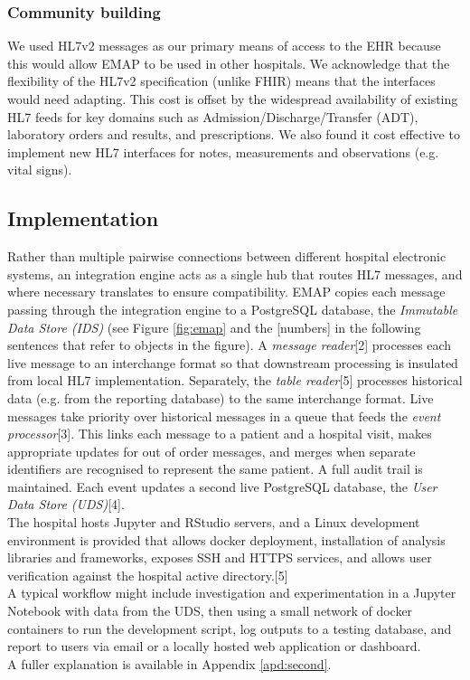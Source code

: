 \documentclass[pmlr,twocolumn,10pt]{jmlr} %
\begin{document}
\subsubsection{Community building}
We used HL7v2 messages as our primary means of access to the EHR because this would allow EMAP to be used in other hospitals. We acknowledge that the flexibility of the HL7v2 specification (unlike FHIR) means that the interfaces would need adapting. This cost is offset by the widespread availability of existing HL7 feeds for key domains such as Admission/Discharge/Transfer (ADT), laboratory orders and results, and prescriptions. We also found it cost effective to implement new HL7 interfaces for notes, measurements and observations (e.g. vital signs).

\subsection{Implementation}
Rather than multiple pairwise connections between different hospital electronic systems, an integration engine acts as a single hub that routes HL7 messages, and where necessary translates to ensure compatibility. EMAP  copies each message passing through the integration engine to a PostgreSQL database, the \textit{Immutable Data Store (IDS)} (see Figure \ref{fig:emap} and the [numbers] in the following sentences that refer to objects in the figure). A \textit{message reader}[2] processes each live message to an interchange format so that downstream processing is insulated from local HL7 implementation. Separately, the \textit{table reader}[5] processes historical data (e.g. from the reporting database) to the same interchange format. Live messages take priority over historical messages in a queue that feeds the \textit{event processor}[3]. This links each message to a patient and a hospital visit, makes appropriate updates for out of order messages, and merges when separate identifiers are recognised to represent the same patient. A full audit trail is maintained. Each event updates a second live PostgreSQL database, the \textit{User Data Store (UDS)}[4].\\
The hospital hosts Jupyter and RStudio servers, and a Linux development environment is provided that allows docker deployment, installation of analysis libraries and frameworks, exposes SSH and HTTPS services, and allows user verification against the hospital active directory.[5] \\
A typical workflow might include investigation and experimentation in a Jupyter Notebook with data from the UDS, then using a small network of docker containers to run the development script, log outputs to a testing database, and report to users via email or a locally hosted web application or dashboard. \\
A fuller explanation is available in Appendix \ref{apd:second}.
\end{document}
